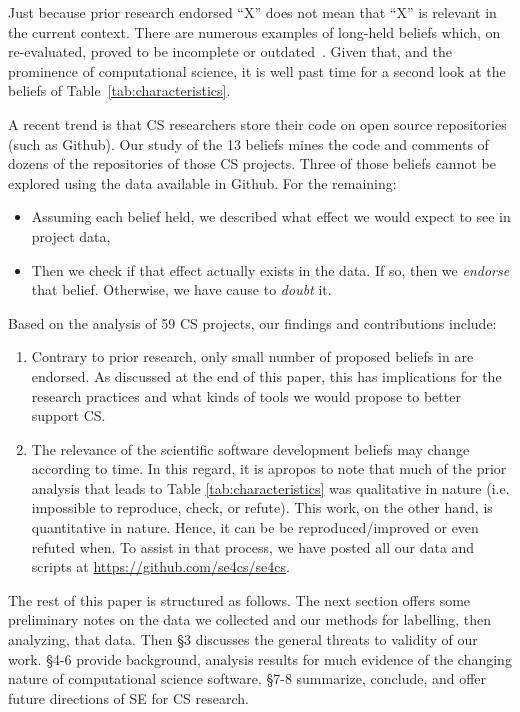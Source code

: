 \documentclass[sigconf]{acmart}
\newcommand{\bi}{\begin{itemize}}
\newcommand{\ei}{\end{itemize}}
\newcommand{\be}{\begin{enumerate}}
\newcommand{\ee}{\end{enumerate}}
\begin{document}


Just  because  prior research endorsed
 ``X'' does not mean that  ``X'' is relevant in the current context. There are numerous examples of long-held beliefs which, on re-evaluated, proved to be incomplete or outdated~\cite{menzies17,dev16}. 
Given that, and the prominence  of 
computational science, it is 
well past time for a second look at the beliefs of 
Table~\ref{tab:characteristics}. 

A recent trend is that CS researchers store their code on open source repositories (such as Github).
Our study of the 13 beliefs mines the code and comments of dozens of the repositories of  those CS projects. Three of those beliefs cannot be explored using the data available in Github. For the remaining:
\bi
\item Assuming each belief held,
we described what effect   we would expect to see in project data,
\item Then we check if that effect actually exists in the data.
If so, then  we  {\em endorse} that belief. Otherwise, we have cause to {\em doubt} it. 
\ei

Based on the analysis of 59 CS projects, our findings and contributions include: 
\be
\item Contrary to prior research, only small number of proposed beliefs in \cite{johan18_secs} are endorsed. As discussed at the end of this paper, this has implications for the research practices and what kinds of tools we would propose to better support CS. 
\item The relevance of the scientific software development beliefs may change according to time.
In this regard, it is apropos to note that
  much of the prior analysis that leads to Table \ref{tab:characteristics} was qualitative in nature (i.e. impossible to reproduce, check, or refute). This work, on the other hand, is quantitative in nature. Hence, it can be be reproduced/improved or even refuted when.  To assist in that process,  we have posted all our data and scripts at
\url{https://github.com/se4cs/se4cs}. 
\ee

The rest of this paper is structured as follows.
The next section offers some preliminary notes on the data
we collected and our methods for labelling, then analyzing,
that data. Then \S3 discusses the general threats to validity of our work. \S4-6 provide background, analysis results for much evidence
of the changing nature of computational science software. \S7-8 summarize, conclude, and offer future directions of SE for CS research. 
\end{document}
